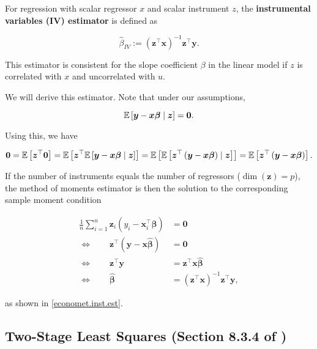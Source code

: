 For regression with scalar regressor \(x\) and scalar instrument \(z\), the \textbf{instrumental variables (IV) estimator} is defined as

\[
\hat{\beta}_{IV} :=  \left( \boldsymbol{z}^\top \boldsymbol{x} \right)^{-1} \boldsymbol{z}^\top \boldsymbol{y}.
\]

This estimator is consistent for the slope coefficient \(\beta\) in the linear model if \(z\) is correlated with \(x\) and uncorrelated with \(u\).

We will derive this estimator. Note that under our assumptions,

\[
\E \left[  \boldsymbol{y} - \boldsymbol{x} \boldsymbol{\beta} \mid \boldsymbol{z} \right] = \boldsymbol{0}.
\]

Using this, we have

\[
\boldsymbol{0} = \E \left[ \boldsymbol{z}^\top \boldsymbol{0} \right] = \E \left[ \boldsymbol{z}^\top \E \left[  \boldsymbol{y} - \boldsymbol{x} \boldsymbol{\beta} \mid \boldsymbol{z} \right] \right] = \E \left[ \E \left[ \boldsymbol{z}^\top  \left( \boldsymbol{y} - \boldsymbol{x} \boldsymbol{\beta} \right)  \mid \boldsymbol{z} \right] \right] = \E \left[ \boldsymbol{z}^\top  \left( \boldsymbol{y} - \boldsymbol{x} \boldsymbol{\beta} \right)   \right].
\]

If the number of instruments equals the number of regressors (\(\operatorname{dim}(\boldsymbol{z}) = p\)), the method of moments estimator is then the solution to the corresponding sample moment condition

\begin{align*}
\frac{1}{n} \sum_{i=1}^n \boldsymbol{z}_i(y_i - \boldsymbol{x}_i^\top \hat{\boldsymbol{\beta}}) & = \boldsymbol{0}
\\ \iff \qquad  \boldsymbol{z}^\top  \left( \boldsymbol{y} - \boldsymbol{x} \hat{\boldsymbol{\beta}} \right) & = \boldsymbol{0}
\\ \iff \qquad  \boldsymbol{z}^\top \boldsymbol{y}  & =   \boldsymbol{z}^\top \boldsymbol{x} \hat{\boldsymbol{\beta}}
\\ \iff \qquad \hat{\boldsymbol{\beta}} & = \left(\boldsymbol{z}^\top \boldsymbol{x}  \right)^{-1}  \boldsymbol{z}^\top \boldsymbol{y} ,
\end{align*}

as shown in \eqref{economet.inst.est}.

\subsection{Two-Stage Least Squares (Section 8.3.4 of \citet{Greene2003Econometric})}


